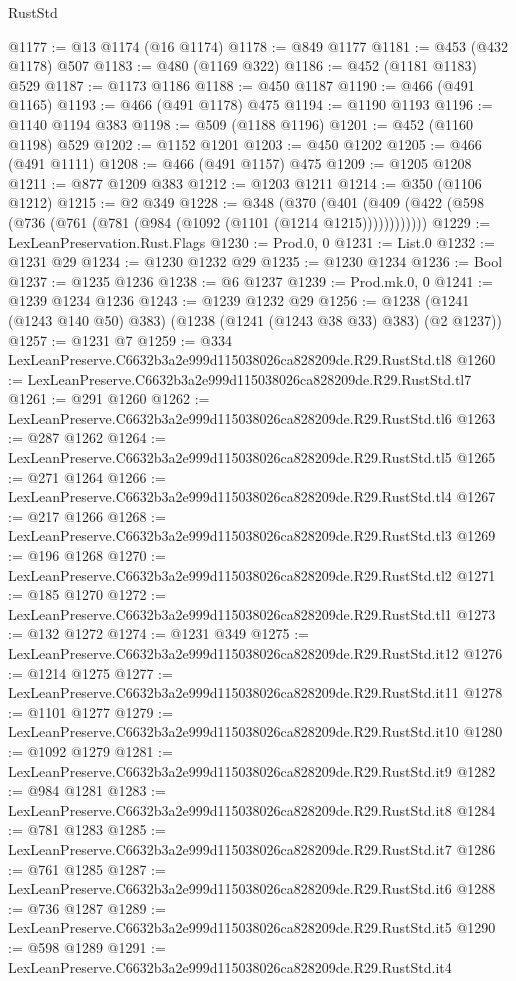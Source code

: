 \begin{lexlean}{RustStd}
\begin{coremodule}
@1177 := @13 @1174 (@16 @1174)
@1178 := @849 @1177
@1181 := @453 (@432 @1178) @507
@1183 := @480 (@1169 @322)
@1186 := @452 (@1181 @1183) @529
@1187 := @1173 @1186
@1188 := @450 @1187
@1190 := @466 (@491 @1165)
@1193 := @466 (@491 @1178) @475
@1194 := @1190 @1193
@1196 := @1140 @1194 @383
@1198 := @509 (@1188 @1196)
@1201 := @452 (@1160 @1198) @529
@1202 := @1152 @1201
@1203 := @450 @1202
@1205 := @466 (@491 @1111)
@1208 := @466 (@491 @1157) @475
@1209 := @1205 @1208
@1211 := @877 @1209 @383
@1212 := @1203 @1211
@1214 := @350 (@1106 @1212)
@1215 := @2 @349
@1228 := @348
    (@370 (@401 (@409 (@422 (@598 (@736 (@761 (@781 (@984 (@1092 (@1101 (@1214 @1215))))))))))))
@1229 := LexLeanPreservation.Rust.Flags
@1230 := Prod.{0, 0}
@1231 := List.{0}
@1232 := @1231 @29
@1234 := @1230 @1232 @29
@1235 := @1230 @1234
@1236 := Bool
@1237 := @1235 @1236
@1238 := @6 @1237
@1239 := Prod.mk.{0, 0}
@1241 := @1239 @1234 @1236
@1243 := @1239 @1232 @29
@1256 := @1238 (@1241 (@1243 @140 @50) @383) (@1238 (@1241 (@1243 @38 @33) @383) (@2 @1237))
@1257 := @1231 @7
@1259 := @334 LexLeanPreserve.C6632b3a2e999d115038026ca828209de.R29.RustStd.tl8
@1260 := LexLeanPreserve.C6632b3a2e999d115038026ca828209de.R29.RustStd.tl7
@1261 := @291 @1260
@1262 := LexLeanPreserve.C6632b3a2e999d115038026ca828209de.R29.RustStd.tl6
@1263 := @287 @1262
@1264 := LexLeanPreserve.C6632b3a2e999d115038026ca828209de.R29.RustStd.tl5
@1265 := @271 @1264
@1266 := LexLeanPreserve.C6632b3a2e999d115038026ca828209de.R29.RustStd.tl4
@1267 := @217 @1266
@1268 := LexLeanPreserve.C6632b3a2e999d115038026ca828209de.R29.RustStd.tl3
@1269 := @196 @1268
@1270 := LexLeanPreserve.C6632b3a2e999d115038026ca828209de.R29.RustStd.tl2
@1271 := @185 @1270
@1272 := LexLeanPreserve.C6632b3a2e999d115038026ca828209de.R29.RustStd.tl1
@1273 := @132 @1272
@1274 := @1231 @349
@1275 := LexLeanPreserve.C6632b3a2e999d115038026ca828209de.R29.RustStd.it12
@1276 := @1214 @1275
@1277 := LexLeanPreserve.C6632b3a2e999d115038026ca828209de.R29.RustStd.it11
@1278 := @1101 @1277
@1279 := LexLeanPreserve.C6632b3a2e999d115038026ca828209de.R29.RustStd.it10
@1280 := @1092 @1279
@1281 := LexLeanPreserve.C6632b3a2e999d115038026ca828209de.R29.RustStd.it9
@1282 := @984 @1281
@1283 := LexLeanPreserve.C6632b3a2e999d115038026ca828209de.R29.RustStd.it8
@1284 := @781 @1283
@1285 := LexLeanPreserve.C6632b3a2e999d115038026ca828209de.R29.RustStd.it7
@1286 := @761 @1285
@1287 := LexLeanPreserve.C6632b3a2e999d115038026ca828209de.R29.RustStd.it6
@1288 := @736 @1287
@1289 := LexLeanPreserve.C6632b3a2e999d115038026ca828209de.R29.RustStd.it5
@1290 := @598 @1289
@1291 := LexLeanPreserve.C6632b3a2e999d115038026ca828209de.R29.RustStd.it4

\end{coremodule}
\end{lexlean}
